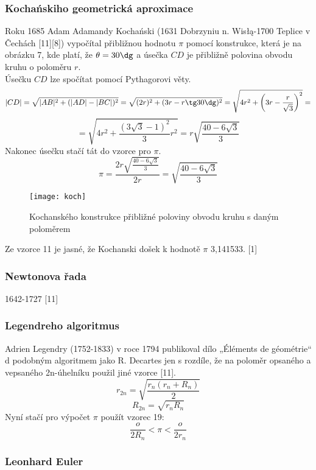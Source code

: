 \documentclass[rocnikovka]{gzwroc} %
\begin{document}
\subsubsection{Kochańskiho geometrická aproximace}
Roku 1685 Adam Adamandy Kochański (1631 Dobrzyniu n. Wisłą-1700 Teplice v Čechách [11][8]) vypočítal přibližnou hodnotu $\pi$ pomocí konstrukce, která je na obrázku 7, kde platí, že $\theta =30\dg$ a úsečka $CD$ je přibližně polovina obvodu kruhu o poloměru $r$.\\
Úsečku $CD$ lze spočítat pomocí Pythagorovi věty.
$$ |CD|=\sqrt{|AB|^2+(|AD|-|BC|)^2}=\sqrt{(2r)^2+(3r-r\tg 30\dg)^2} = \sqrt{4r^2+\left(3r-\frac{r}{\sqrt{3}}\right)^2}= $$
\begin{equation}
=\sqrt{4r^2+\frac{(3\sqrt{3}-1)^2}{3}r^2} = r\sqrt{\frac{40-6\sqrt{3}}{3}}
\end{equation}
Nakonec úsečku stačí tát do vzorce pro $\pi$.
\begin{equation}
\pi=\frac{2r\sqrt{\frac{40-6\sqrt{3}}{3}}}{2r}=\sqrt{\frac{40-6\sqrt{3}}{3}}
\end{equation}
\begin{figure}[!ht]
\texttt{[image: koch]}
\caption{Kochanského konstrukce přibližné poloviny obvodu kruhu s daným poloměrem}
\label{fig:kruh}
\end{figure}
Ze vzorce 11 je jasné, že Kochanski došek k hodnotě $\pi$ 3,141533. [1]
\subsubsection{Newtonova řada}
1642-1727 [11]
\subsubsection{Legendreho algoritmus}
Adrien Legendry (1752-1833) v roce 1794 publikoval dílo „Éléments de géométrie“ d podobným algoritmem jako R. Decartes jen s rozdíle, že na poloměr opsaného a vepsaného 2n-úhelníku použil jiné vzorce [11].
\begin{equation}
r_{2n}=\sqrt{\frac{r_n(r_n+R_n)}{2}}
\end{equation}
\begin{equation}
R_{2n}=\sqrt{r_nR_n}
\end{equation}
Nyní stačí pro výpočet $\pi$ použít vzorec 19:
\begin{equation}
\frac{o}{2R_n}<\pi<\frac{o}{2r_n}
\end{equation}
\subsubsection{Leonhard Euler}
\end{document}
